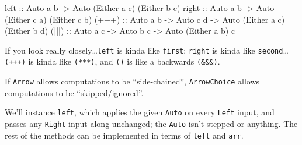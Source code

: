 \documentclass[]{article}
\newenvironment{Shaded}{}{}
\newcommand{\CommentTok}[1]{\textcolor[rgb]{0.38,0.63,0.69}{\textit{#1}}}
\newcommand{\DataTypeTok}[1]{\textcolor[rgb]{0.56,0.13,0.00}{#1}}
\newcommand{\KeywordTok}[1]{\textcolor[rgb]{0.00,0.44,0.13}{\textbf{#1}}}
\newcommand{\NormalTok}[1]{#1}
\newcommand{\OperatorTok}[1]{\textcolor[rgb]{0.40,0.40,0.40}{#1}}
\newcommand{\OtherTok}[1]{\textcolor[rgb]{0.00,0.44,0.13}{#1}}
\begin{document}
\begin{Shaded}
\begin{Highlighting}[]
\OtherTok{left  ::} \DataTypeTok{Auto}\NormalTok{ a b }\OtherTok{{-}>} \DataTypeTok{Auto}\NormalTok{ (}\DataTypeTok{Either}\NormalTok{ a c) (}\DataTypeTok{Either}\NormalTok{ b c)}
\OtherTok{right ::} \DataTypeTok{Auto}\NormalTok{ a b }\OtherTok{{-}>} \DataTypeTok{Auto}\NormalTok{ (}\DataTypeTok{Either}\NormalTok{ c a) (}\DataTypeTok{Either}\NormalTok{ c b)}
\OtherTok{(+++) ::} \DataTypeTok{Auto}\NormalTok{ a b }\OtherTok{{-}>} \DataTypeTok{Auto}\NormalTok{ c d }\OtherTok{{-}>} \DataTypeTok{Auto}\NormalTok{ (}\DataTypeTok{Either}\NormalTok{ a c) (}\DataTypeTok{Either}\NormalTok{ b d)}
\OtherTok{(|||) ::} \DataTypeTok{Auto}\NormalTok{ a c }\OtherTok{{-}>} \DataTypeTok{Auto}\NormalTok{ b c }\OtherTok{{-}>} \DataTypeTok{Auto}\NormalTok{ (}\DataTypeTok{Either}\NormalTok{ a b) c}
\end{Highlighting}
\end{Shaded}

If you look really closely\ldots{}\texttt{left} is kinda like \texttt{first};
\texttt{right} is kinda like \texttt{second}\ldots{}\texttt{(+++)} is kinda like
\texttt{(***)}, and \texttt{(\textbar{}\textbar{}\textbar{})} is like a
backwards \texttt{(\&\&\&)}.

If \texttt{Arrow} allows computations to be ``side-chained'',
\texttt{ArrowChoice} allows computations to be ``skipped/ignored''.

We'll instance \texttt{left}, which applies the given \texttt{Auto} on every
\texttt{Left} input, and passes any \texttt{Right} input along unchanged; the
\texttt{Auto} isn't stepped or anything. The rest of the methods can be
implemented in terms of \texttt{left} and \texttt{arr}.

\begin{Shaded}
\end{Shaded}
\end{document}
